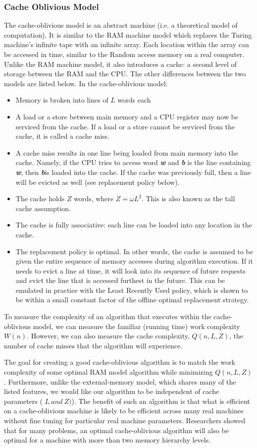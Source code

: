 \documentclass[12pt,a4paper]{book}
\begin{document}
\subsubsection{Cache Oblivious Model}
The cache-oblivious model is an abstract machine (i.e. a theoretical model of computation). It is similar to the RAM machine model which replaces the Turing machine's infinite tape with an infinite array. Each location within the array can be accessed in time, similar to the Random access memory on a real computer. Unlike the RAM machine model, it also introduces a cache: a second level of storage between the RAM and the CPU. The other differences between the two models are listed below. In the cache-oblivious model:
\begin{itemize}
\item Memory is broken into lines of $L$ words each
\item A load or a store between main memory and a CPU register may now be serviced from the cache. If a load or a store cannot be serviced from the cache, it is called a cache miss.
\item A cache miss results in one line being loaded from main memory into the cache. Namely, if the CPU tries to access word \textbf{\textit{w}} and \textbf{\textit{b}} is the line containing \textbf{\textit{w}}, then \textbf{\textit{b}}is loaded into the cache. If the cache was previously full, then a line will be evicted as well (see replacement policy below).
\item The cache holds $Z$ words, where $Z=\omega{L^{2}} $. This is also known as the tall cache assumption. 
\item The cache is fully associative: each line can be loaded into any location in the cache.
\item The replacement policy is optimal. In other words, the cache is assumed to be given the entire sequence of memory accesses during algorithm execution. If it needs to evict a line at time, it will look into its sequence of future requests and evict the line that is accessed furthest in the future. This can be emulated in practice with the Least Recently Used policy, which is shown to be within a small constant factor of the offline optimal replacement strategy.
\end{itemize} 
To measure the complexity of an algorithm that executes within the cache-oblivious model, we can measure the familiar (running time) work complexity $W(n)$. However, we can also measure the cache complexity, $Q(n,L,Z)$, the number of cache misses that the algorithm will experience.
\par 
The goal for creating a good cache-oblivious algorithm is to match the work complexity of some optimal RAM model algorithm while minimizing $Q(n,L,Z)$. Furthermore, unlike the external-memory model, which shares many of the listed features, we would like our algorithm to be independent of cache parameters ( $L\ and\ Z)$). The benefit of such an algorithm is that what is efficient on a cache-oblivious machine is likely to be efficient across many real machines without fine tuning for particular real machine parameters. Researchers showed that for many problems, an optimal cache-oblivious algorithm will also be optimal for a machine with more than two memory hierarchy levels.
\end{document}
